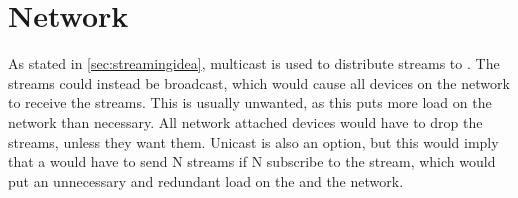 
\section{Network} \label{sec:analysis:network}

As stated in \ref{sec:streamingidea}, multicast is used to distribute streams to . The streams could instead be broadcast, which would cause all devices on the network to receive the streams. This is usually unwanted, as this puts more load on the network than necessary. All network attached devices would have to drop the streams, unless they want them. Unicast is also an option, but this would imply that a  would have to send N streams if N  subscribe to the stream, which would put an unnecessary and redundant load on the  and the network.

